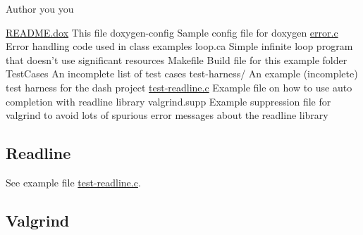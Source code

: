\begin{DoxyAuthor}{Author}
you you
\end{DoxyAuthor}

\begin{DoxyPre}\end{DoxyPre}



\begin{DoxyPre}\hyperlink{README_8dox}{README.dox}      This file
doxygen-config  Sample config file for doxygen
\hyperlink{error_8c}{error.c}         Error handling code used in class examples
loop.ca         Simple infinite loop program that doesn't use significant resources
Makefile        Build file for this example folder
TestCases       An incomplete list of test cases
test-harness/   An example (incomplete) test harness for the dash project
\hyperlink{test-readline_8c}{test-readline.c} Example file on how to use auto completion with readline library
valgrind.supp   Example suppression file for valgrind to avoid lots of spurious error messages about the readline library\end{DoxyPre}



\begin{DoxyPre}\subsection*{Readline
}\end{DoxyPre}



\begin{DoxyPre}\end{DoxyPre}



\begin{DoxyPre}See example file \hyperlink{test-readline_8c}{test-readline.c}.\end{DoxyPre}



\begin{DoxyPre}\subsection*{Valgrind
}\end{DoxyPre}



\begin{DoxyPre}\end{DoxyPre}



